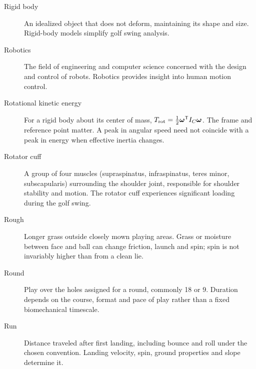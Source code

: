 \begin{description}
\item[Rigid body] An idealized object that does not deform, maintaining its shape and size. Rigid-body models simplify golf swing analysis.

\item[Robotics] The field of engineering and computer science concerned with the design and control of robots. Robotics provides insight into human motion control.

\item[Rotational kinetic energy] For a rigid body about its center of mass, $T_{\rm rot}=\tfrac12\boldsymbol{\omega}^\mathsf{T}I_C\boldsymbol{\omega}$. The frame and reference point matter. A peak in angular speed need not coincide with a peak in energy when effective inertia changes.

\item[Rotator cuff] A group of four muscles (supraspinatus, infraspinatus, teres minor, subscapularis) surrounding the shoulder joint, responsible for shoulder stability and motion. The rotator cuff experiences significant loading during the golf swing.

\item[Rough] Longer grass outside closely mown playing areas. Grass or moisture between face and ball can change friction, launch and spin; spin is not invariably higher than from a clean lie.

\item[Round] Play over the holes assigned for a round, commonly 18 or 9. Duration depends on the course, format and pace of play rather than a fixed biomechanical timescale.

\item[Run] Distance traveled after first landing, including bounce and roll under the chosen convention. Landing velocity, spin, ground properties and slope determine it.

\end{description}
